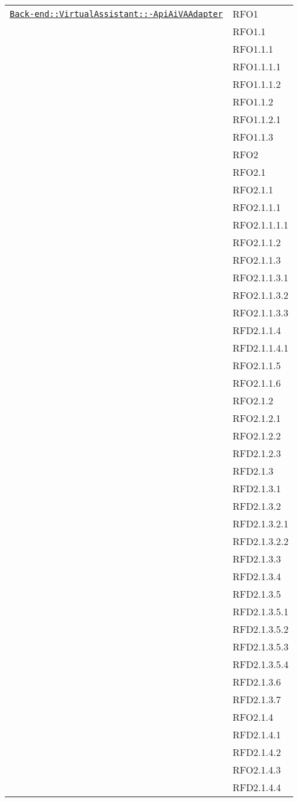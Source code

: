 \begin{longtable}{|>{\centering}m{10cm}|m{3cm}<{\centering}|}
\hyperref[Back-end::VirtualAssistant::ApiAiVAAdapter]{\texttt{Back-end::VirtualAssistant::-\linebreak ApiAiVAAdapter}} & RFO1\\
& RFO1.1\\
& RFO1.1.1\\
& RFO1.1.1.1\\
& RFO1.1.1.2\\
& RFO1.1.2\\
& RFO1.1.2.1\\
& RFO1.1.3\\
& RFO2\\
& RFO2.1\\
& RFO2.1.1\\
& RFO2.1.1.1\\
& RFO2.1.1.1.1\\
& RFO2.1.1.2\\
& RFO2.1.1.3\\
& RFO2.1.1.3.1\\
& RFO2.1.1.3.2\\
& RFO2.1.1.3.3\\
& RFD2.1.1.4\\
& RFD2.1.1.4.1\\
& RFO2.1.1.5\\
& RFO2.1.1.6\\
& RFO2.1.2\\
& RFO2.1.2.1\\
& RFO2.1.2.2\\
& RFD2.1.2.3\\
& RFD2.1.3\\
& RFD2.1.3.1\\
& RFD2.1.3.2\\
& RFD2.1.3.2.1\\
& RFD2.1.3.2.2\\
& RFD2.1.3.3\\
& RFD2.1.3.4\\
& RFD2.1.3.5\\
& RFD2.1.3.5.1\\
& RFD2.1.3.5.2\\
& RFD2.1.3.5.3\\
& RFD2.1.3.5.4\\
& RFD2.1.3.6\\
& RFD2.1.3.7\\
& RFO2.1.4\\
& RFD2.1.4.1\\
& RFD2.1.4.2\\
& RFO2.1.4.3\\
& RFD2.1.4.4\\

\end{longtable}
